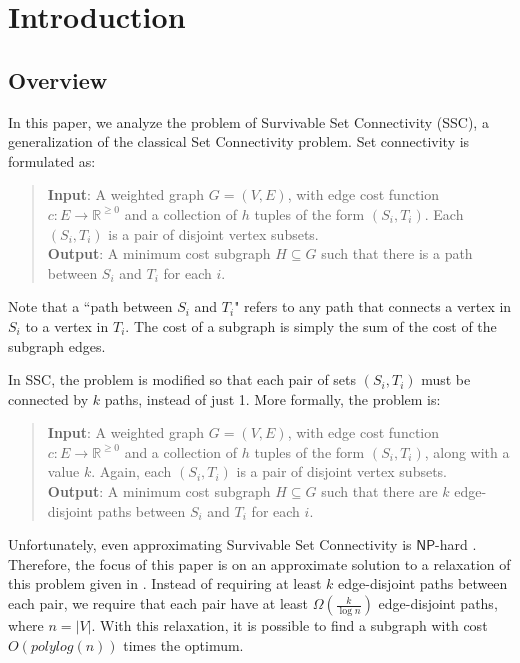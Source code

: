 \documentclass[12pt]{article}
\begin{document}
\maketitle

\section{Introduction}

\subsection{Overview}

In this paper, we analyze the problem of Survivable Set Connectivity (SSC), a generalization of the classical Set Connectivity problem. Set connectivity is formulated as:
\begin{quote}
\textbf{Input}: A weighted graph $G = (V, E)$, with edge cost function $c: E \rightarrow \mathbb{R}^{\geq 0}$ and a collection of $h$ tuples of the form $(S_i, T_i)$. Each $(S_i,T_i)$ is a pair of disjoint vertex subsets. \\
\textbf{Output}: A minimum cost subgraph $H \subseteq G$ such that there is a path between $S_i$ and $T_i$ for each $i$. 
\end{quote}

Note that a ``path between $S_i$ and $T_i$" refers to any path that connects a vertex in $S_i$ to a vertex in $T_i$. The cost of a subgraph is simply the sum of the cost of the subgraph edges.

In SSC, the problem is modified so that each pair of sets $(S_i,T_i)$ must be connected by $k$ paths, instead of just 1. More formally, the problem is:

\begin{quote}
\textbf{Input}: A weighted graph $G = (V, E)$, with edge cost function $c: E \rightarrow \mathbb{R}^{\geq 0}$ and a collection of $h$ tuples of the form $(S_i, T_i)$, along with a value $k$. Again, each $(S_i,T_i)$ is a pair of disjoint vertex subsets. \\
\textbf{Output}: A minimum cost subgraph $H \subseteq G$ such that there are $k$ edge-disjoint paths between $S_i$ and $T_i$ for each $i$. 
\end{quote}

Unfortunately, even approximating Survivable Set Connectivity is $\mathsf{NP}$-hard \cite{ssc}. Therefore, the focus of this paper is on an approximate solution to a relaxation of this problem given in \cite{ssc}. Instead of requiring at least $k$ edge-disjoint paths between each pair, we require that each pair have at least $\Omega(\frac{k}{\log n})$ edge-disjoint paths, where $n = |V|$. With this relaxation, it is possible to find a subgraph with cost $O(polylog(n))$ times the optimum.
\end{document}

